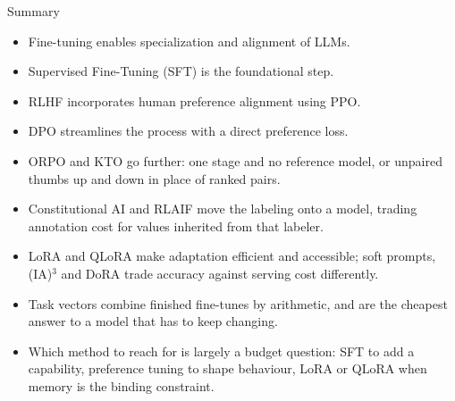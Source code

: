 \begin{frame}[allowframebreaks]{Summary}
  \begin{itemize}
    \item[\textcolor{red}{$\blacktriangleright$}] Fine-tuning enables specialization and alignment of LLMs.
    \item[\textcolor{red}{$\blacktriangleright$}] Supervised Fine-Tuning (SFT) is the foundational step.
    \item[\textcolor{red}{$\blacktriangleright$}] RLHF incorporates human preference alignment using PPO.
    \item[\textcolor{red}{$\blacktriangleright$}] DPO streamlines the process with a direct preference loss.
    \item[\textcolor{red}{$\blacktriangleright$}] ORPO and KTO go further: one stage and no reference model, or unpaired thumbs up and down in place of ranked pairs.
    \item[\textcolor{red}{$\blacktriangleright$}] Constitutional AI and RLAIF move the labeling onto a model, trading annotation cost for values inherited from that labeler.
    \item[\textcolor{red}{$\blacktriangleright$}] LoRA and QLoRA make adaptation efficient and accessible; soft prompts, (IA)$^3$ and DoRA trade accuracy against serving cost differently.
    \item[\textcolor{red}{$\blacktriangleright$}] Task vectors combine finished fine-tunes by arithmetic, and are the cheapest answer to a model that has to keep changing.
    \item[\textcolor{red}{$\blacktriangleright$}] Which method to reach for is largely a budget question: SFT to add a capability, preference tuning to shape behaviour, LoRA or QLoRA when memory is the binding constraint.
  \end{itemize}
\end{frame}

